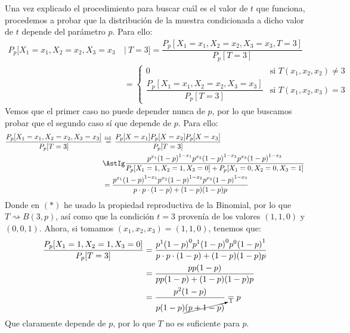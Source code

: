 \begin{ejercicio}
    Una vez explicado el procedimiento para buscar cuál es el valor de $t$ que funciona, procedemos a probar que la distribución de la muestra condicionada a dicho valor de $t$ depende del parámetro $p$. Para ello:
            \begin{align*}
                P_p[X_1 = x_1, X_2=x_2, X_3 = x_3 \ &|\ T=3] = \dfrac{P_p[X_1=x_1, X_2=x_2, X_3 = x_3, T=3]}{P_p[T=3]} \\
                                                           &= \left\{\begin{array}{ll}
                                                               0 & \text{si\ } T(x_1,x_2,x_2)\neq 3 \\
                                                               \dfrac{P_p[X_1=x_1, X_2=x_2, X_3=x_3]}{P_p[T=3]}& \text{si\ } T(x_1,x_2,x_3) = 3
                                                           \end{array}\right. 
            \end{align*}
            Vemos que el primer caso no puede depender nunca de $p$, por lo que buscamos probar que el segundo caso sí que depende de $p$. Para ello:
            \begin{align*}
                \dfrac{P_p[X_1=x_1, X_2=x_2, X_3=x_3]}{P_p[T=3]} &\stackrel{\text{iid.}}{=} \dfrac{P_p[X=x_1]P_p[X=x_2]P_p[X=x_3]}{P_p[T=3]} \\
                                                                 &\AstIg \dfrac{p^{x_1}{(1-p)}^{1-x_1} p^{x_2}{(1-p)}^{1-x_2}p^{x_3}{(1-p)}^{1-x_3}}{P_p[X_1=1,X_2=1,X_3=0]+P_p[X_1=0,X_2=0,X_3=1]} \\
                                                                 &= \dfrac{p^{x_1}{(1-p)}^{1-x_1} p^{x_2}{(1-p)}^{1-x_2}p^{x_3}{(1-p)}^{1-x_3}}{p\cdot p\cdot (1-p) + (1-p)(1-p)p} \\
            \end{align*}
            Donde en $(\ast)$ he usado la propiedad reproductiva de la Binomial, por lo que $T\rightsquigarrow B(3,p)$, así como que la condición $t=3$ provenía de los valores $(1,1,0)$ y $(0,0,1)$.
            Ahora, si tomamos $(x_1,x_2,x_3) = (1,1,0)$, tenemos que:
            \begin{align*}
                \dfrac{P_p[X_1=1, X_2=1, X_3=0]}{P_p[T=3]} &= \dfrac{p^{1}{(1-p)}^{0} p^{1}{(1-p)}^{0}p^{0}{(1-p)}^{1}}{p\cdot p\cdot (1-p) + (1-p)(1-p)p} \\
                                                                 &= \dfrac{pp(1-p)}{pp(1-p)+(1-p)(1-p)p} \\
                                                                 &= \dfrac{p^2(1-p)}{p(1-p)\cancelto{1}{(p+1-p)}} = p
            \end{align*}
            Que claramente depende de $p$, por lo que $T$ no es suficiente para $p$.
\end{ejercicio}

